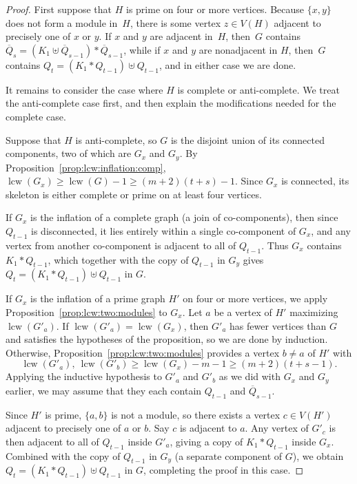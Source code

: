\documentclass[10pt,a4paper]{amsart}
\newcommand{\lcw}{\operatorname{lcw}}
\begin{document}
\begin{proof}
%
%
%

First suppose that $H$ is prime on four or more vertices. Because $\{x,y\}$ does not form a module in~$H$, there is some vertex $z\in V(H)$ adjacent to precisely one of $x$ or $y$. If $x$ and $y$ are adjacent in~$H$, then~$G$ contains $\overline{Q}_s=(K_1\uplus \overline{Q}_{s-1})\ast\overline{Q}_{s-1}$, while if $x$ and $y$ are nonadjacent in $H$, then~$G$ contains $Q_t=(K_1\ast Q_{t-1})\uplus Q_{t-1}$, and in either case we are done.

%
%
%

It remains to consider the case where $H$ is complete or anti-complete. We treat the anti-complete case first, and then explain the modifications needed for the complete case.

Suppose that $H$ is anti-complete, so $G$ is the disjoint union of its connected components, two of which are $G_x$ and $G_y$. By Proposition~\ref{prop:lcw:inflation:comp}, $\lcw(G_x)\ge\lcw(G)-1\ge (m+2)(t+s)-1$. Since $G_x$ is connected, its skeleton is either complete or prime on at least four vertices.

If $G_x$ is the inflation of a complete graph (a join of co-components), then since $Q_{t-1}$ is disconnected, it lies entirely within a single co-component of $G_x$, and any vertex from another co-component is adjacent to all of $Q_{t-1}$. Thus $G_x$ contains $K_1\ast Q_{t-1}$, which together with the copy of $Q_{t-1}$ in $G_y$ gives $Q_t=(K_1\ast Q_{t-1})\uplus Q_{t-1}$ in $G$.

%
%

If $G_x$ is the inflation of a prime graph $H'$ on four or more vertices, we apply Proposition~\ref{prop:lcw:two:modules} to $G_x$. Let $a$ be a vertex of $H'$ maximizing $\lcw(G'_a)$. If $\lcw(G'_a)=\lcw(G_x)$, then $G'_a$ has fewer vertices than $G$ and satisfies the hypotheses of the proposition, so we are done by induction. Otherwise, Proposition~\ref{prop:lcw:two:modules} provides a vertex $b\neq a$ of $H'$ with
\[
	\lcw(G'_a),\ \lcw(G'_b)
	\ge
	\lcw(G_x)-m-1
	\ge
	(m+2)(t+s-1).
\]
Applying the inductive hypothesis to $G'_a$ and $G'_b$ as we did with $G_x$ and $G_y$ earlier, we may assume that they each contain $Q_{t-1}$ and $\overline{Q}_{s-1}$.

Since $H'$ is prime, $\{a,b\}$ is not a module, so there exists a vertex $c\in V(H')$ adjacent to precisely one of $a$ or $b$. Say $c$ is adjacent to $a$. Any vertex of $G'_c$ is then adjacent to all of $Q_{t-1}$ inside $G'_a$, giving a copy of $K_1\ast Q_{t-1}$ inside $G_x$. Combined with the copy of $Q_{t-1}$ in $G_y$ (a separate component of $G$), we obtain $Q_t=(K_1\ast Q_{t-1})\uplus Q_{t-1}$ in $G$, completing the proof in this case.


\end{proof}
\end{document}
